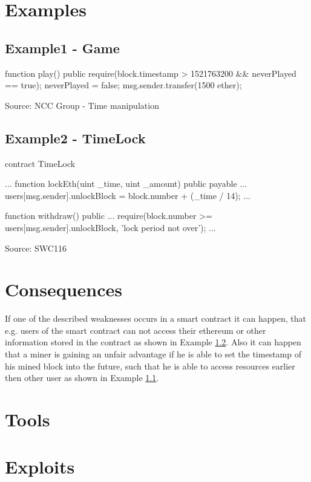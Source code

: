 \documentclass{article}
\begin{document}
\section{Examples} 
\subsection{Example1 - Game} \label{ex:1}
\begin{solidity} 
    function play() public {
        require(block.timestamp > 1521763200 && neverPlayed == true);
        neverPlayed = false;
        msg.sender.transfer(1500 ether);
    }
\end{solidity}
Source: NCC Group - Time manipulation \cite{DASP2018}

\subsection{Example2 - TimeLock} \label{ex:2}
\begin{solidity} 
    contract TimeLock {
		...
		function lockEth(uint _time, uint _amount) public payable {
			...
			users[msg.sender].unlockBlock = block.number + (_time / 14);
			...
		}

    function withdraw() public {
		...
        require(block.number >= users[msg.sender].unlockBlock, 'lock period not over');
		...
    }
}
\end{solidity}
Source: SWC116 \cite{swc116}

\section{Consequences}
If one of the described weaknesses occurs in a smart contract it can happen, that e.g. users of the smart contract can not access
their ethereum or other information stored in the contract as shown in Example \ref{ex:2}. \newline
Also it can happen that a miner is gaining an unfair advantage if he is able to set the timestamp of his mined block into the future,
such that he is able to access resources earlier then other user as shown in Example \ref{ex:1}.

\section{Tools}
\section{Exploits}
\end{document}

